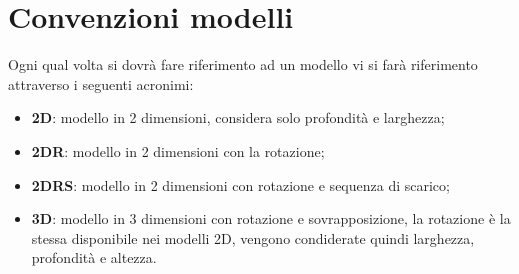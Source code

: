 \section{Convenzioni modelli}
Ogni qual volta si dovrà fare riferimento ad un modello vi si farà riferimento attraverso i seguenti acronimi:
\begin{itemize}
	\item \textbf{2D}: modello in 2 dimensioni, considera solo profondità e larghezza;
	\item \textbf{2DR}: modello in 2 dimensioni con la rotazione;
	\item \textbf{2DRS}: modello in 2 dimensioni con rotazione e sequenza di scarico;
	\item \textbf{3D}: modello in 3 dimensioni con rotazione e sovrapposizione, la rotazione è la stessa disponibile nei modelli 2D, vengono condiderate quindi larghezza, profondità e altezza.
\end{itemize}